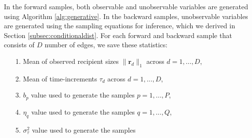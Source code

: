 \documentclass[ba]{imsart}
\numberwithin{equation}{section}
\theoremstyle{plain}
\begin{document}
   In the forward samples, both observable and unobservable variables are generated using Algorithm \ref{alg:generative}. In the backward samples, unobservable variables are generated using the sampling equations for inference, which we derived in Section \ref{subsec:conditionaldist}. For each forward and backward sample that consists of $D$ number of edges, we save these statistics:
   \begin{itemize}
   	\item[1.] Mean of observed recipient sizes $ \lVert \boldsymbol{r}_{d} \rVert_1 $ across $d=1,\ldots,D$,
   	\item[2.] Mean of time-increments $\tau_d$ across $d=1,...,D$,
   	\item[3.] $b_p$ value used to generate the samples $p = 1,...,P$,
   	\item[4.] $\eta_q$ value used to generate the samples $q = 1,...,Q$,
   	\item[5.] $\sigma^2_\tau$ value used to generate the samples
   \end{itemize}
   
\end{document}
